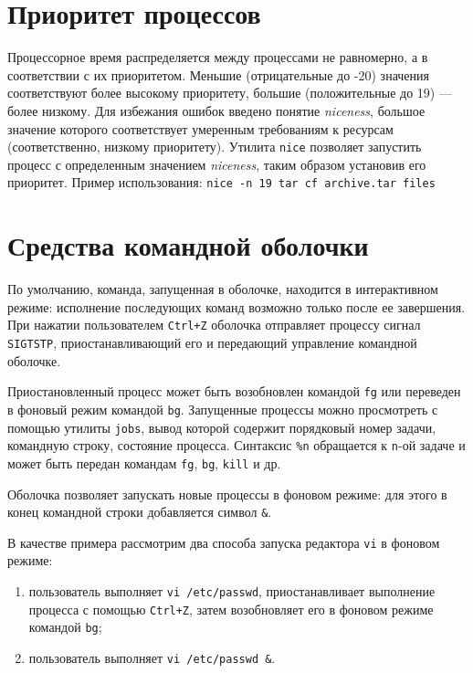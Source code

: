 \documentclass[listings]{labreport}
\begin{document}
\section*{Приоритет процессов}

Процессорное время распределяется между процессами не равномерно, а в соответствии с их приоритетом.
Меньшие (отрицательные до -20) значения соответствуют более высокому приоритету, большие (положительные до 19) — более низкому.
Для избежания ошибок введено понятие \textit{niceness}, большое значение которого соответствует умеренным требованиям к ресурсам
(соответственно, низкому приоритету).
Утилита \texttt{nice} позволяет запустить процесс с определенным значением \textit{niceness}, таким образом установив его приоритет.
Пример использования: \texttt{nice -n 19 tar cf archive.tar files}

\section*{Средства командной оболочки}

По умолчанию, команда, запущенная в оболочке, находится в интерактивном режиме: исполнение последующих команд возможно только после ее завершения.
При нажатии пользователем \texttt{Ctrl+Z} оболочка отправляет процессу сигнал \texttt{SIGTSTP}, приостанавливающий его и 
передающий управление командной оболочке.

Приостановленный процесс может быть возобновлен командой \texttt{fg} или переведен в фоновый режим командой \texttt{bg}. Запущенные
процессы можно просмотреть с помощью утилиты \texttt{jobs}, вывод которой содержит порядковый номер задачи, командную строку, состояние процесса.
Синтаксис \texttt{\%n} обращается к \texttt{n}-ой задаче и может быть передан командам \texttt{fg}, \texttt{bg}, \texttt{kill} и др.

Оболочка позволяет запускать новые процессы в фоновом режиме: для этого в конец командной строки добавляется символ \texttt{\&}.

В качестве примера рассмотрим два способа запуска редактора \texttt{vi} в фоновом режиме:
\begin{enumerate}
\item пользователь выполняет \texttt{vi /etc/passwd}, приостанавливает выполнение процесса с помощью \texttt{Ctrl+Z},
затем возобновляет его в фоновом режиме командой \texttt{bg};
\item пользователь выполняет \texttt{vi /etc/passwd \&}.
\end{enumerate}
\end{document}
